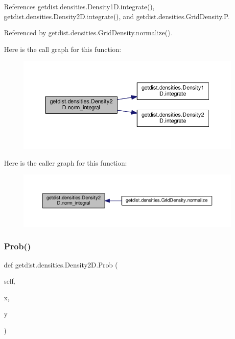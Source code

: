 References getdist.\+densities.\+Density1\+D.\+integrate(), getdist.\+densities.\+Density2\+D.\+integrate(), and getdist.\+densities.\+Grid\+Density.\+P.



Referenced by getdist.\+densities.\+Grid\+Density.\+normalize().

Here is the call graph for this function\+:
\nopagebreak
\begin{figure}[H]
\begin{center}
\leavevmode
\includegraphics[width=350pt]{classgetdist_1_1densities_1_1Density2D_a626cf46833a5a5df4fdb42a0b7d2510c_cgraph}
\end{center}
\end{figure}
Here is the caller graph for this function\+:
\nopagebreak
\begin{figure}[H]
\begin{center}
\leavevmode
\includegraphics[width=350pt]{classgetdist_1_1densities_1_1Density2D_a626cf46833a5a5df4fdb42a0b7d2510c_icgraph}
\end{center}
\end{figure}
\mbox{\label{classgetdist_1_1densities_1_1Density2D_a24e04a59b25556b75a32cc82272aef31}} 
\subsubsection{\texorpdfstring{Prob()}{Prob()}}
{\footnotesize\ttfamily def getdist.\+densities.\+Density2\+D.\+Prob (\begin{DoxyParamCaption}\item[{}]{self,  }\item[{}]{x,  }\item[{}]{y }\end{DoxyParamCaption})}

